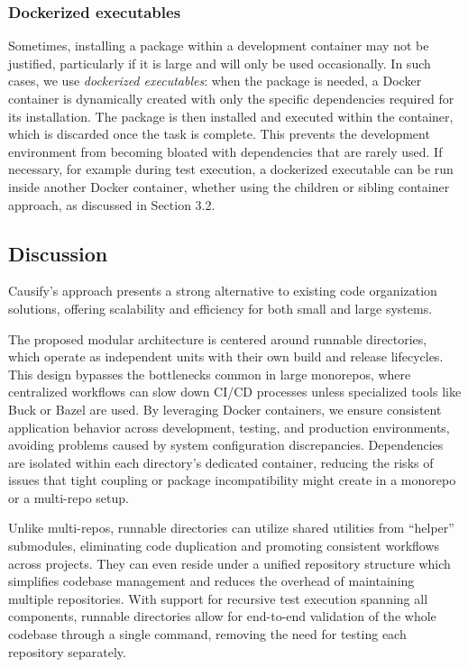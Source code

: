 \documentclass{article}
\begin{document}
\subsubsection{Dockerized executables}

Sometimes, installing a package within a development container may not be
justified, particularly if it is large and will only be used occasionally. In
such cases, we use \emph{dockerized executables}: when the package is needed, a
Docker container is dynamically created with only the specific dependencies
required for its installation. The package is then installed and executed within
the container, which is discarded once the task is complete. This prevents the development
environment from becoming bloated with dependencies that are rarely used. If
necessary, for example during test execution, a dockerized executable can be run
inside another Docker container, whether using the children or sibling container
approach, as discussed in Section 3.2.

\subsection{Discussion}

Causify's approach presents a strong alternative to existing code organization solutions,
offering scalability and efficiency for both small and large systems.

The proposed modular architecture is centered around runnable directories, which
operate as independent units with their own build and release lifecycles. This
design bypasses the bottlenecks common in large monorepos, where centralized workflows
can slow down CI/CD processes unless specialized tools like Buck or Bazel are used.
By leveraging Docker containers, we ensure consistent application behavior across
development, testing, and production environments, avoiding problems caused by
system configuration discrepancies. Dependencies are isolated within each directory's
dedicated container, reducing the risks of issues that tight coupling or package
incompatibility might create in a monorepo or a multi-repo setup.

Unlike multi-repos, runnable directories can utilize shared utilities from ``helper''
submodules, eliminating code duplication and promoting consistent workflows
across projects. They can even reside under a unified repository structure which
simplifies codebase management and reduces the overhead of maintaining multiple repositories.
With support for recursive test execution spanning all components, runnable directories
allow for end-to-end validation of the whole codebase through a single command,
removing the need for testing each repository separately.
\end{document}
